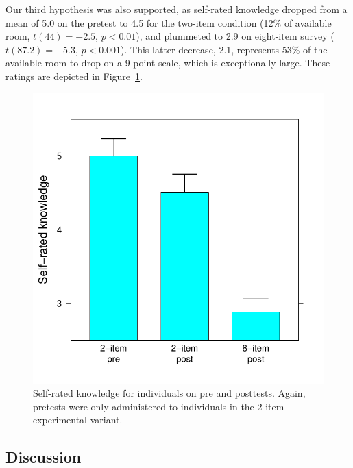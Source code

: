 Our third hypothesis was also supported, as self-rated knowledge dropped from a
mean of 5.0 on the pretest to 4.5 for the two-item condition (12\% of available
room, $t(44)=-2.5$, $p<0.01$), and plummeted to 2.9 on eight-item survey
($t(87.2)=-5.3$, $p<0.001$). This latter decrease, 2.1, represents 53\% of the
available room to drop on a 9-point scale, which is exceptionally large. These
ratings are depicted in Figure~\ref{fig:evil-know}.

\begin{figure}
    \centering
    \includegraphics{evil-know.pdf}
    \caption{Self-rated knowledge for individuals on pre and posttests. Again,
        pretests were only administered to individuals in the 2-item
        experimental variant.}
    \label{fig:evil-know}
\end{figure}

\subsection{Discussion}

